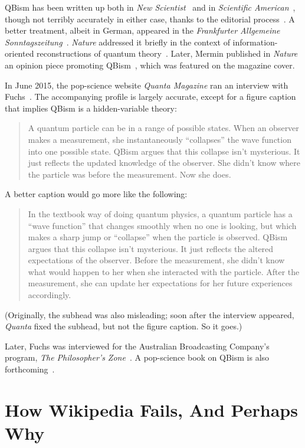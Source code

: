 \documentclass[aps,pra,superscriptaddress,12pt,tightenlines,nofootinbib]{revtex4}
\newcommand{\booktitle}{\textsl}
\begin{document}
QBism has been written up both in \booktitle{New
  Scientist}~\cite{Chalmers2014} and in \booktitle{Scientific
  American}~\cite{VonBaeyer2013}, though not terribly accurately in
either case, thanks to the editorial process~\cite{Mermin14b,
  Mermin-Vienna, Mermin-Bell}.  A better treatment, albeit in German,
appeared in the \booktitle{Frankfurter Allgemeine
  Sonntagszeitung}~\cite{VonRauchhaupt2014}. \booktitle{Nature}
addressed it briefly in the context of information-oriented
reconstructions of quantum theory~\cite{Ball2013}.  Later, Mermin
published in \booktitle{Nature} an opinion piece promoting
QBism~\cite{Mermin14}, which was featured on the magazine cover.

In June 2015, the pop-science website \booktitle{Quanta Magazine} ran
an interview with Fuchs~\cite{Gefter2015}.  The accompanying profile
is largely accurate, except for a figure caption that implies QBism is
a hidden-variable theory:
\begin{quotation}
\noindent A quantum particle can be in a range of possible
states. When an observer makes a measurement, she instantaneously
``collapses'' the wave function into one possible state. QBism argues
that this collapse isn't mysterious. It just reflects the updated
knowledge of the observer. She didn't know where the particle was
before the measurement. Now she does.
\end{quotation}
A better caption would go more like the following:
\begin{quotation}
\noindent In the textbook way of doing quantum physics, a quantum
particle has a ``wave function'' that changes smoothly when no one is
looking, but which makes a sharp jump or ``collapse'' when the
particle is observed. QBism argues that this collapse isn't
mysterious. It just reflects the altered expectations of the
observer. Before the measurement, she didn't know what would happen to
her when she interacted with the particle. After the measurement, she
can update her expectations for her future experiences accordingly.
\end{quotation}
(Originally, the subhead was also misleading; soon after the interview
appeared, \booktitle{Quanta} fixed the subhead, but not the figure
caption.  So it goes.)

Later, Fuchs was interviewed for the Australian Broadcasting Company's
program, \booktitle{The Philosopher's Zone}~\cite{philzone}.  A
pop-science book on QBism is also forthcoming~\cite{VonBaeyer2016}.

\section{How Wikipedia Fails, And Perhaps Why}
\end{document}
